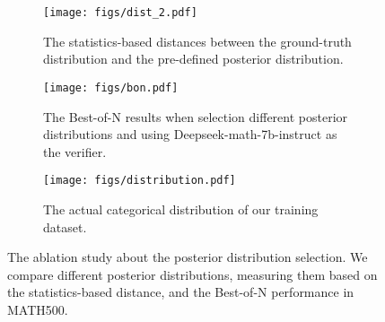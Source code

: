 \begin{figure*}[h!]
    \centering
    \begin{subfigure}[t]{0.3\textwidth}
        \centering
        \texttt{[image: figs/dist\_2.pdf]}
        \caption{The statistics-based distances between the ground-truth distribution and the pre-defined posterior distribution.}
        \label{fig:distance}
    \end{subfigure}
    \hfill
    \begin{subfigure}[t]{0.3\textwidth}
        \centering
        \texttt{[image: figs/bon.pdf]}
        \caption{The Best-of-N results when selection different posterior distributions and using Deepseek-math-7b-instruct as the verifier.}
        \label{fig:bon}
    \end{subfigure}
    \hfill
    \begin{subfigure}[t]{0.3\textwidth}
        \centering
        \texttt{[image: figs/distribution.pdf]}
        \caption{The actual categorical distribution of our training dataset.}
        \label{fig:distribution}
    \end{subfigure}
    \caption{The ablation study about the posterior distribution selection. We compare different posterior distributions, measuring them based on the statistics-based distance, and the Best-of-N performance in MATH500.}
\end{figure*}
